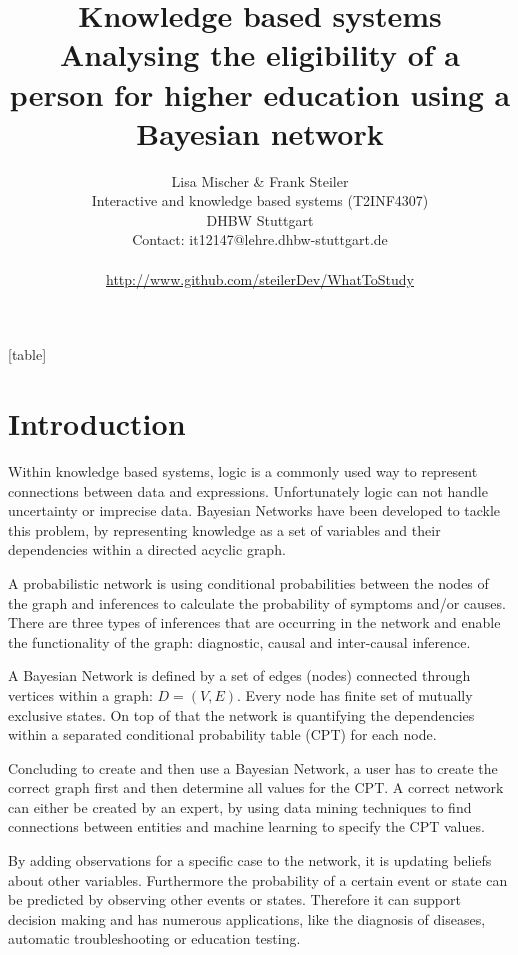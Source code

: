 \documentclass[%
	pdftex,
	oneside,        %
	11pt,           %
	parskip=half,   %
	headsepline,    %
	footsepline,    %
	abstracton,     %
	USenglish,      %
	a4paper,        %
]{report}
\title{Knowledge based systems\\ Analysing the eligibility of a person for higher education using a Bayesian network}
\author{Lisa Mischer \& Frank Steiler\\ Interactive and knowledge based systems (T2INF4307)\\ DHBW Stuttgart\\ Contact: it12147@lehre.dhbw-stuttgart.de\\\\ \url{http://www.github.com/steilerDev/WhatToStudy}}
\begin{document}

[table]

\maketitle

\newpage
\thispagestyle{empty}
\mbox{}
\setcounter{page}{0}

\tableofcontents

\chapter{Introduction}
Within knowledge based systems, logic is a commonly used way to represent connections between data and expressions. Unfortunately logic can not handle uncertainty or imprecise data. Bayesian Networks have been developed to tackle this problem, by representing knowledge as a set of variables and their dependencies within a directed acyclic graph. \cite{Reichardt:2014aa}

A probabilistic network is using conditional probabilities between the nodes of the graph and inferences to calculate the probability of symptoms and/or causes. There are three types of inferences that are occurring in the network and enable the functionality of the graph: diagnostic, causal and inter-causal inference.

A Bayesian Network is defined by a set of edges (nodes) connected through vertices within a graph: $D=(V,E)$. Every node has finite set of mutually exclusive states. On top of that the network is quantifying the dependencies within a separated conditional probability table (CPT) for each node. \cite{Vomlel:2005aa}

Concluding to create and then use a Bayesian Network, a user has to create the correct graph first and then determine all values for the CPT. A correct network can either be created by an expert, by using data mining techniques to find connections between entities and machine learning to specify the CPT values. 

By adding observations for a specific case to the network, it is updating beliefs about other variables. Furthermore the probability of a certain event or state can be predicted by observing other events or states. Therefore it can support decision making and has numerous applications, like the diagnosis of diseases, automatic troubleshooting or education testing. \cite{Vomlel:2005aa}
\end{document}
